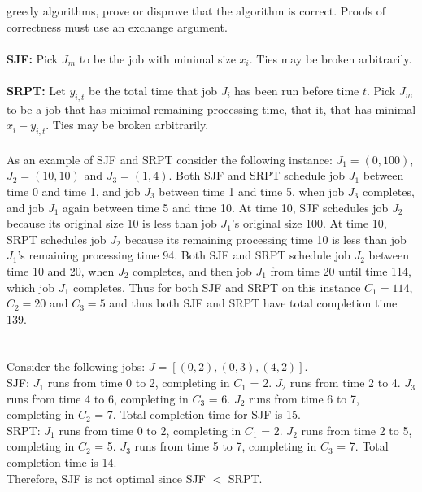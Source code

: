 \documentclass[10pt]{article}
\begin{document}
	greedy algorithms, prove or disprove that the algorithm is correct.  Proofs of correctness must use an
	exchange argument.\\
	\\
	\textbf{SJF:} Pick $J_{m}$ to be the job with minimal size $x_{i}$. Ties may be broken arbitrarily.\\
	\\
	\textbf{SRPT:} Let $y_{i,t}$ be the total time that job $J_{i}$ has been run before time $t$. Pick $J_{m}$ to be a job that has
	minimal remaining processing time, that it, that has minimal $x_{i} - y_{i,t}$. Ties may be broken arbitrarily.\\
	\\
	As an example of SJF and SRPT consider the following instance:  $J_{1} = (0, 100)$, $J_{2} = (10, 10)$ and
	$J_{3} = (1, 4)$. Both SJF and SRPT schedule job $J_{1}$ between time 0 and time 1, and job $J _{3}$ between time
	1 and time 5, when job $J_{3}$ completes, and job $J_{1}$ again between time 5 and time 10. At time 10, SJF
	schedules job $J_{2}$ because its original size 10 is less than job $J_{1}$'s original size 100.  At time 10, SRPT
	schedules job $J_{2}$ because its remaining processing time 10 is less than job $J_{1}$'s remaining processing
	time 94. Both SJF and SRPT schedule job $J_{2}$ between time 10 and 20, when $J_{2}$ completes, and then
	job $J_{1}$ from time 20 until time 114, which job $J_{1}$ completes.  Thus for both SJF and SRPT on this
	instance $C_{1} = 114$, $C_{2} = 20$ and $C_{3} = 5$ and thus both SJF and SRPT have total completion time 139.\\
	\\
	\\
	Consider the following jobs: $J = [(0,2), (0,3), (4,2)]$.\\
	SJF:
	$J_{1}$ runs from time 0 to 2, completing in $C_{1}$ = 2.
	$J_{2}$ runs from time 2 to 4.
	$J_{3}$ runs from time 4 to 6, completing in $C_{3}$ = 6.
	$J_{2}$ runs from time 6 to 7, completing in $C_{2}$ = 7.
	Total completion time for SJF is 15.\\
	SRPT:
	$J_{1}$ runs from time 0 to 2, completing in $C_{1}$ = 2.
	$J_{2}$ runs from time 2 to 5, completing in $C_{2}$ = 5.
	$J_{3}$ runs from time 5 to 7, completing in $C_{3}$ = 7.
	Total completion time is 14.\\
	Therefore, SJF is not optimal since SJF $<$ SRPT.\\
	
	
\end{document}
